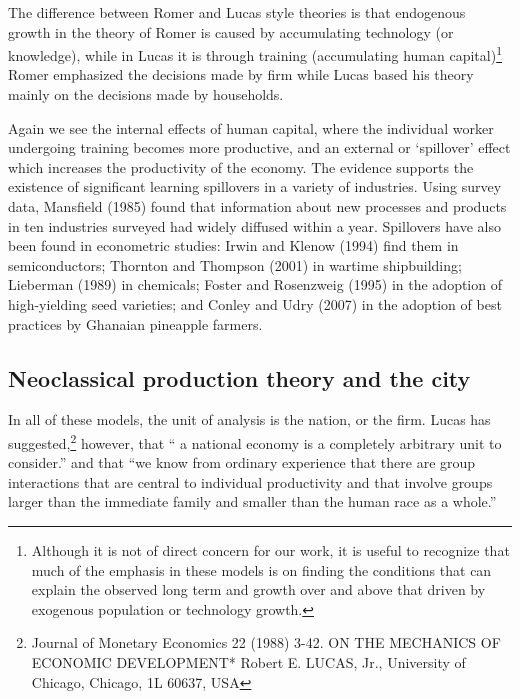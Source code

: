 The difference between Romer and Lucas style theories is that endogenous growth in the theory of Romer is caused by accumulating technology (or knowledge), while in Lucas it is through training (accumulating human capital)\footnote{Although it is not of direct concern for our work, it is useful to recognize that much of the emphasis in these models is on finding the conditions that can explain the observed long term  and growth over and above that driven by exogenous population or technology growth. } Romer  emphasized the decisions made by firm while Lucas  based his theory mainly on the decisions made by households. 


Again we see the  internal effects of human capital, where the individual worker undergoing training becomes more productive, and an external or `spillover' effect which increases the productivity of the economy. 
The evidence supports the existence of significant learning spillovers in a variety of industries. Using survey data, Mansfield (1985) found that information about new processes and products in ten industries surveyed had widely diffused within a year. Spillovers have also been found in econometric studies: Irwin and Klenow (1994) find them in semiconductors; Thornton and Thompson (2001) in wartime shipbuilding; Lieberman (1989) in chemicals; Foster and Rosenzweig (1995) in the adoption of high-yielding seed varieties; and Conley and Udry (2007) in the adoption of best practices by Ghanaian pineapple farmers. 

\subsection{Neoclassical production theory and the city}

In all of these models, the unit of analysis is the nation,  or the firm. Lucas has suggested,\footnote{Journal of Monetary Economics 22 (1988) 3-42.  ON THE MECHANICS OF ECONOMIC DEVELOPMENT*
Robert E. LUCAS, Jr., University of Chicago, Chicago, 1L 60637, USA}
however, that `` a national economy is a completely arbitrary unit to consider.'' and that ``we know from ordinary experience that there are group interactions that are central to individual productivity and that involve groups larger than the immediate family and smaller than the human race as a whole.''  

